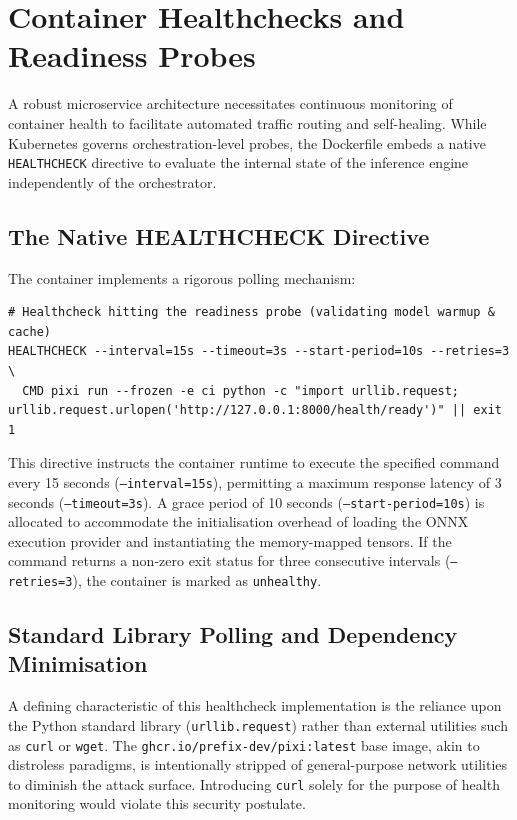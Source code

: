 \section{Container Healthchecks and Readiness Probes}
\label{sec:healthchecks}

A robust microservice architecture necessitates continuous monitoring of container health to facilitate automated traffic routing and self-healing. While Kubernetes governs orchestration-level probes, the Dockerfile embeds a native \texttt{HEALTHCHECK} directive to evaluate the internal state of the inference engine independently of the orchestrator.

\subsection{The Native HEALTHCHECK Directive}

The container implements a rigorous polling mechanism:

\begin{verbatim}
# Healthcheck hitting the readiness probe (validating model warmup & cache)
HEALTHCHECK --interval=15s --timeout=3s --start-period=10s --retries=3 \
  CMD pixi run --frozen -e ci python -c "import urllib.request; urllib.request.urlopen('http://127.0.0.1:8000/health/ready')" || exit 1
\end{verbatim}

This directive instructs the container runtime to execute the specified command every 15 seconds (\texttt{--interval=15s}), permitting a maximum response latency of 3 seconds (\texttt{--timeout=3s}). A grace period of 10 seconds (\texttt{--start-period=10s}) is allocated to accommodate the initialisation overhead of loading the ONNX execution provider and instantiating the memory-mapped tensors. If the command returns a non-zero exit status for three consecutive intervals (\texttt{--retries=3}), the container is marked as \texttt{unhealthy}.

\subsection{Standard Library Polling and Dependency Minimisation}

A defining characteristic of this healthcheck implementation is the reliance upon the Python standard library (\texttt{urllib.request}) rather than external utilities such as \texttt{curl} or \texttt{wget}. The \texttt{ghcr.io/prefix-dev/pixi:latest} base image, akin to distroless paradigms, is intentionally stripped of general-purpose network utilities to diminish the attack surface. Introducing \texttt{curl} solely for the purpose of health monitoring would violate this security postulate.

